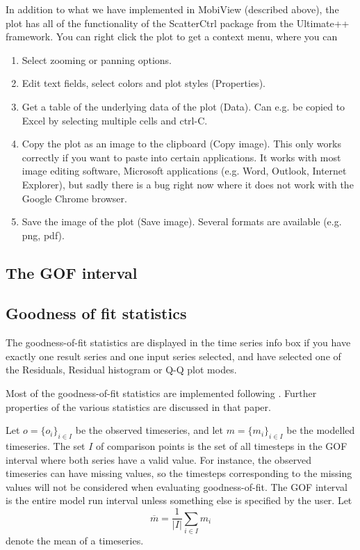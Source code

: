 \documentclass[11pt]{article}
\theoremstyle{definition}
\begin{document}
In addition to what we have implemented in MobiView (described above), the plot has all of the functionality of the ScatterCtrl package from the Ultimate++ framework. You can right click the plot to get a context menu, where you can
\begin{enumerate}[i]
\item Select zooming or panning options.
\item Edit text fields, select colors and plot styles (Properties).
\item Get a table of the underlying data of the plot (Data). Can e.g. be copied to Excel by selecting multiple cells and ctrl-C.
\item Copy the plot as an image to the clipboard (Copy image). This only works correctly if you want to paste into certain applications. It works with most image editing software, Microsoft applications (e.g. Word, Outlook, Internet Explorer), but sadly there is a bug right now where it does not work with the Google Chrome browser.
\item Save the image of the plot (Save image). Several formats are available (e.g. png, pdf).
\end{enumerate}

\subsection{The GOF interval}\label{sec:gofint}

\subsection{Goodness of fit statistics}\label{sec:gof}

The goodness-of-fit statistics are displayed in the time series info box if you have exactly one result series and one input series selected, and have selected one of the Residuals, Residual histogram or Q-Q plot modes. 

Most of the goodness-of-fit statistics are implemented following \cite{krause05}. Further properties of the various statistics are discussed in that paper.

Let $o=\{o_i\}_{i\in I}$ be the observed timeseries, and let $m=\{m_i\}_{i\in I}$ be the modelled timeseries. The set $I$ of comparison points is the set of all timesteps in the GOF interval where both series have a valid value. For instance, the observed timeseries can have missing values, so the timesteps corresponding to the missing values will not be considered when evaluating goodness-of-fit. The GOF interval is the entire model run interval unless something else is specified by the user. Let
\[
\overline{m} = \frac{1}{|I|}\sum_{i\in I}m_i
\]
denote the mean of a timeseries.
\end{document}
